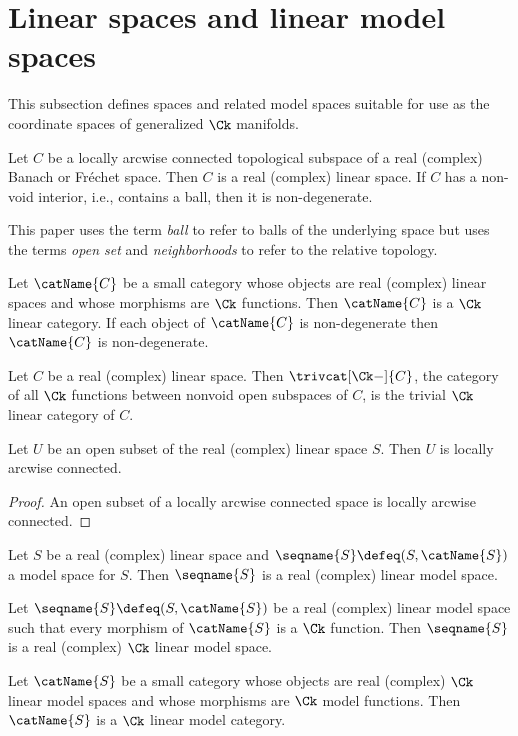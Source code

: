 \documentclass{article}
\begin{document}
\section {Linear spaces and linear model spaces}
{
  \showlabelsinline
  \label{sec:lin}
}

This subsection defines spaces and related model spaces suitable for use
as the coordinate spaces of generalized $\Ck$ manifolds.

\begin{definition}
{
  \showlabelsinline
  \label{def:lin}
}
Let $C$ be a locally arcwise connected topological subspace of a real
(complex) Banach or Fr\'echet space. Then $C$ is a real (complex) linear
space.  If $C$ has a non-void interior, i.e., contains a ball, then it
is non-degenerate.

\begin{remark}
This paper uses the term \textit{ball} to refer to balls of the
underlying space but uses the terms \textit{open set} and
\textit{neighborhoods} to refer to the relative topology.
\end{remark}

Let $\catName{C}$ be a small category whose objects are real (complex)
linear spaces and whose morphisms are $\Ck$ functions. Then
$\catName{C}$ is a $\Ck$ linear category.  If each object of
$\catName{C}$ is non-degenerate then $\catName{C}$ is non-degenerate.

Let $C$ be a real (complex) linear space. Then $\trivcat[\Ck-]{C}$, the
category of all $\Ck$ functions between nonvoid open subspaces of $C$,
is the trivial $\Ck$ linear category of $C$.
\end{definition}

\begin{lemma}
Let $U$ be an open subset of the real (complex) linear space $S$. Then
$U$ is locally arcwise connected.

\begin{proof}
An open subset of a locally arcwise connected space is locally arcwise
connected.
\end{proof}
\end{lemma}

\begin{definition}
Let $S$ be a real (complex) linear space and
$\seqname{S} \defeq (S, \catName{S})$ a model space for $S$.
Then $\seqname{S}$ is a real (complex) linear model space.

Let $\seqname{S} \defeq (S, \catName{S})$ be a real (complex) linear
model space such that every morphism of $\catName{S}$ is a $\Ck$
function. Then $\seqname{S}$ is a real (complex) $\Ck$ linear model
space.

Let $\catName{S}$ be a small category whose objects are real (complex)
$\Ck$ linear model spaces and whose morphisms are $\Ck$ model functions.
Then $\catName{S}$ is a $\Ck$ linear model category.
\end{definition}
\end{document}
